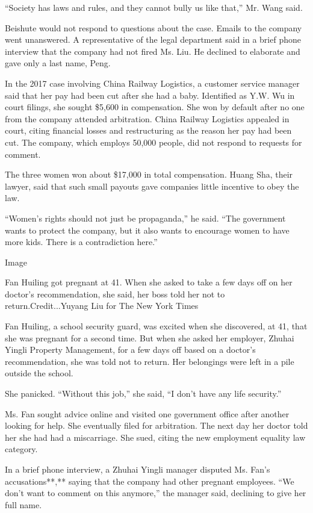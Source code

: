 ``Society has laws and rules, and they cannot bully us like that,'' Mr.
Wang said.

Beishute would not respond to questions about the case. Emails to the
company went unanswered. A representative of the legal department said
in a brief phone interview that the company had not fired Ms. Liu. He
declined to elaborate and gave only a last name, Peng.

In the 2017 case involving China Railway Logistics, a customer service
manager said that her pay had been cut after she had a baby. Identified
as Y.W. Wu in court filings, she sought \$5,600 in compensation. She won
by default after no one from the company attended arbitration. China
Railway Logistics appealed in court, citing financial losses and
restructuring as the reason her pay had been cut. The company, which
employs 50,000 people, did not respond to requests for comment.

The three women won about \$17,000 in total compensation. Huang Sha,
their lawyer, said that such small payouts gave companies little
incentive to obey the law.

``Women's rights should not just be propaganda,'' he said. ``The
government wants to protect the company, but it also wants to encourage
women to have more kids. There is a contradiction here.''

Image

Fan Huiling got pregnant at 41. When she asked to take a few days off on
her doctor's recommendation, she said, her boss told her not to
return.Credit...Yuyang Liu for The New York Times

Fan Huiling, a school security guard, was excited when she discovered,
at 41, that she was pregnant for a second time. But when she asked her
employer, Zhuhai Yingli Property Management, for a few days off based on
a doctor's recommendation, she was told not to return. Her belongings
were left in a pile outside the school.

She panicked. ``Without this job,'' she said, ``I don't have any life
security.''

Ms. Fan sought advice online and visited one government office after
another looking for help. She eventually filed for arbitration. The next
day her doctor told her she had had a miscarriage. She sued, citing the
new employment equality law category.

In a brief phone interview, a Zhuhai Yingli manager disputed Ms. Fan's
accusations**,** saying that the company had other pregnant employees.
``We don't want to comment on this anymore,'' the manager said,
declining to give her full name.

